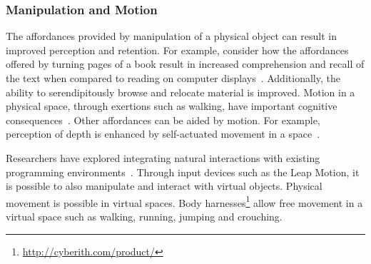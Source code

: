 \documentclass[conference]{IEEEtran}
\begin{document}



\subsubsection{Manipulation and Motion}

The affordances provided by manipulation of a physical object can result in improved perception and retention. 
For example, consider how the affordances offered by turning pages of a book result in increased comprehension and recall of the text when compared to reading on computer displays~\cite{Noyes:2008}.
Additionally, the ability to serendipitously browse and relocate material is improved.
Motion in a physical space, through exertions such as walking, have important cognitive consequences~\cite{Oppezzo:2014}.
Other affordances can be aided by motion. For example, perception of depth is enhanced by self-actuated movement in a space~\cite{Held:1963}.

Researchers have explored integrating natural interactions with existing programming environments~\cite{Delimarschi:2014}.
Through input devices such as the Leap Motion, it is possible to also manipulate and interact with virtual objects.
Physical movement is possible in virtual spaces.  Body harnesses\footnote{\url{http://cyberith.com/product/}} allow free movement in a virtual space such as walking, running, jumping and crouching.%
\end{document}
